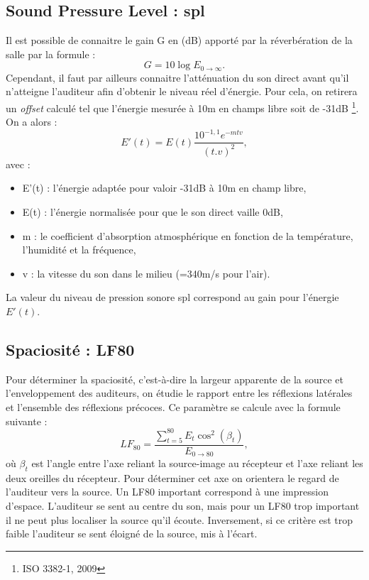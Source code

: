 \subsection{Sound Pressure Level : \gls{spl}}
Il est possible de connaitre le gain \gls{G} en (dB) apporté par la réverbération de la salle par la formule :
\begin{equation}
G =  10\log{E_{0\to\infty}}.
\end{equation}
Cependant, il faut par ailleurs connaitre l'atténuation du son direct avant qu'il n'atteigne l'auditeur afin d'obtenir le niveau réel d'énergie. Pour cela, on retirera un \textit{offset} calculé tel que l'énergie mesurée à 10m en champs libre soit de -31dB \footnote{ISO 3382-1, 2009}. On a alors :
\begin{equation}
E'(t) =  E(t) \frac{ 10^{-1,1}e^{-mtv}}{(t.v)^2},
\end{equation}
avec :
\begin{itemize}
	\item E'(t) : l'énergie adaptée pour valoir -31dB à 10m en champ libre,
	\item E(t) : l'énergie normalisée pour que le son direct vaille 0dB,
	\item m : le coefficient d'absorption atmosphérique en fonction de la température, l'humidité et la fréquence,
	\item v : la vitesse du son dans le milieu (=340m/s pour l'air).
\end{itemize}
La valeur du niveau de pression sonore \gls{spl} correspond au gain pour l'énergie $E'(t)$. 

\subsection{Spaciosité : \gls{LF80}}
Pour déterminer la spaciosité, c'est-à-dire la largeur apparente de la source et l'enveloppement des auditeurs, on étudie le rapport entre les réflexions latérales et l'ensemble des réflexions précoces. Ce paramètre se calcule avec la formule suivante :
\begin{equation}
LF_{80} =   \frac{\sum\limits_{t=5}^{80} E_t \cos^2(\beta_t)}{E_{0\to80}}, 
\end{equation}
où $\beta_t$ est l'angle entre l'axe reliant la source-image au récepteur et l'axe reliant les deux oreilles du récepteur. Pour déterminer cet axe on orientera le regard de l'auditeur vers la source.
Un   \gls{LF80}  important  correspond  à  une  impression  d’espace.  L’auditeur  se  sent  au  centre  du  son,  mais  pour un \gls{LF80}  trop  important  il  ne  peut  plus  localiser  la  source  qu’il  écoute. Inversement,  si  ce  critère  est  trop  faible  l’auditeur  se  sent  éloigné  de  la  source,  mis  à  l’écart. 


